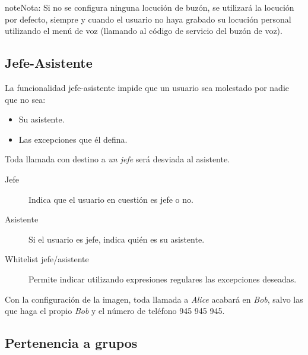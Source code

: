 \documentclass[letterpaper,10pt,spanish]{sphinxmanual}
\begin{document}
\begin{notice}{note}{Nota:}
Si no se configura ninguna locución de buzón, se utilizará la locución por defecto, siempre y cuando el usuario no haya grabado su locución personal utilizando el menú de voz (llamando al código de servicio del buzón de voz).
\end{notice}


\subsection{Jefe-Asistente}
\label{pbx_features/users:boss-assistant}
\noindent{}

La funcionalidad jefe-asistente impide que un usuario sea molestado por nadie que no sea:
\begin{itemize}
\item {} 
Su asistente.

\item {} 
Las excepciones que él defina.

\end{itemize}

Toda llamada con destino a \emph{un jefe} será desviada al asistente.
\begin{description}
\item[{Jefe}] \leavevmode{}\label{pbx_features/users:term-is-boss}
Indica que el usuario en cuestión es jefe o no.

\item[{Asistente}] \leavevmode{}\label{pbx_features/users:term-assistant}
Si el usuario es jefe, indica quién es su asistente.

\item[{Whitelist jefe/asistente}] \leavevmode{}\label{pbx_features/users:term-whitelist-regular-expression}
Permite indicar utilizando expresiones regulares las excepciones deseadas.

\end{description}

Con la configuración de la imagen, toda llamada a \emph{Alice} acabará en \emph{Bob}, salvo las que haga el propio \emph{Bob} y el número de teléfono 945 945 945.


\subsection{Pertenencia a grupos}
\label{pbx_features/users:group-configuration}
\noindent{}
\end{document}
